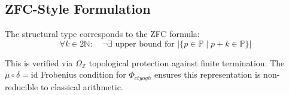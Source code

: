 \documentclass[12pt,a4paper]{article}
\begin{document}
\subsection{ZFC-Style Formulation}

The structural type corresponds to the ZFC formula:
\[
\forall k \in 2\mathbb{N}:\quad \neg \exists \text{ upper bound for } |\{p \in \mathbb{P} \mid p + k \in \mathbb{P}\}|
\]

This is verified via $\Omega_{\mathbb{Z}}$ topological protection against finite termination. The $\mu \circ \delta = \text{id}$ Frobenius condition for $\Phi_{ctyogh}$ ensures this representation is non-reducible to classical arithmetic.
\end{document}
